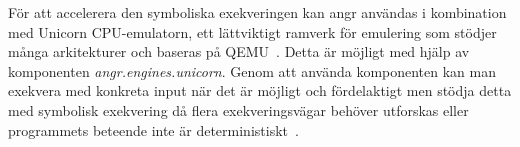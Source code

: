För att accelerera den symboliska exekveringen kan angr användas i kombination 
med Unicorn CPU-emulatorn, ett lättviktigt ramverk för emulering som stödjer 
många arkitekturer och baseras på QEMU~\cite{UnicornEngine}. Detta är möjligt 
med hjälp av komponenten \emph{angr.engines.unicorn}. Genom att använda komponenten 
kan man exekvera med konkreta input när det är möjligt och fördelaktigt men stödja 
detta med symbolisk exekvering då flera exekveringsvägar behöver utforskas 
eller programmets beteende inte är deterministiskt~\cite{angr_uni}. 

